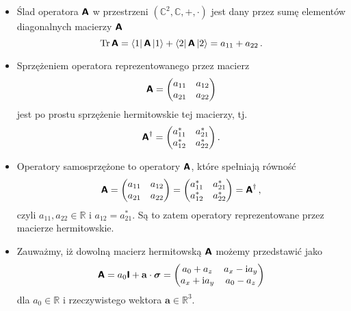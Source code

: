 \documentclass{myclass}
\begin{document}
\begin{itemize}
    
    \item Ślad operatora \(\boldsymbol{\mathsf{A}}\) w przestrzeni \((\mathbb{C}^2,\mathbb{C},+,\cdot)\) jest dany
    przez sumę elementów diagonalnych macierzy \(\boldsymbol{\mathsf{A}}\)
    \begin{equation*}
        \Trace{\oper{A}} = \bra{1}\oper{A}\ket{1} + \bra{2}\oper{A}\ket{2} = a_{11} + a_{22}\,.
    \end{equation*}

    \item Sprzężeniem operatora reprezentowanego przez macierz
    \begin{equation*}
        \oper{A} = \mqty(a_{11} & a_{12} \\ a_{21} & a_{22})
    \end{equation*}
    jest po prostu sprzężenie hermitowskie tej macierzy, tj.
    \begin{equation*}
        \oper{A}^\dagger = \mqty(a^*_{11} & a^*_{21} \\ a^*_{12} & a^*_{22})\,.
    \end{equation*}

    \item Operatory samosprzężone to operatory \(\boldsymbol{\mathsf{A}}\), które spełniają równość
    \begin{equation*}
        \oper{A} = \mqty(a_{11} & a_{12} \\ a_{21} & a_{22}) = \mqty(a^*_{11} & a^*_{21} \\ a^*_{12} & a^*_{22}) = \oper{A}^\dagger\,,
    \end{equation*}
    czyli \(a_{11},a_{22}\in\mathbb{R}\) i \(a_{12} = a_{21}^*\). Są to zatem operatory
    reprezentowane przez macierze hermitowskie.

    \item Zauważmy, iż dowolną macierz hermitowską \(\boldsymbol{\mathsf{A}}\) możemy przedstawić jako
    \begin{equation*}
        \oper{A} = a_0\oper{I} + \mathbf{a}\cdot\boldsymbol{\sigma} =\mqty(a_0+a_z & a_x-\im a_y \\ a_x + \im a_y & a_0 - a_z)
    \end{equation*}
    dla \(a_0\in\mathbb{R}\) i rzeczywistego wektora \(\mathbf{a}\in\mathbb{R}^3\).


\end{itemize}
\end{document}
